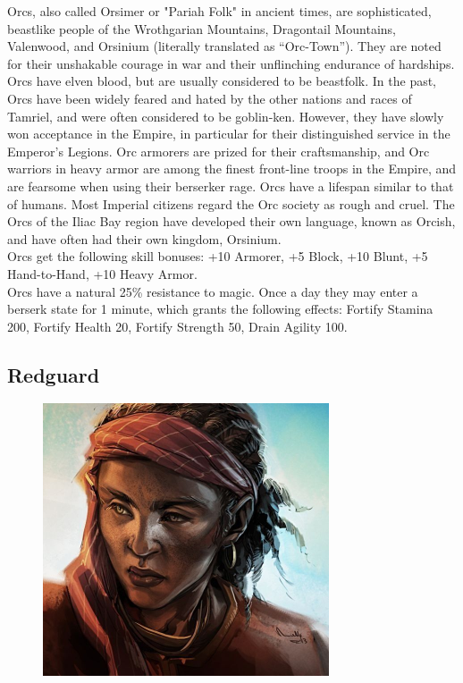 \documentclass[12pt]{book}
\begin{document}
Orcs, also called Orsimer or "Pariah Folk" in ancient times, are sophisticated, beastlike people of the Wrothgarian Mountains, Dragontail Mountains, Valenwood, and Orsinium (literally translated as ``Orc-Town''). They are noted for their unshakable courage in war and their unflinching endurance of hardships. Orcs have elven blood, but are usually considered to be beastfolk. In the past, Orcs have been widely feared and hated by the other nations and races of Tamriel, and were often considered to be goblin-ken. However, they have slowly won acceptance in the Empire, in particular for their distinguished service in the Emperor's Legions. Orc armorers are prized for their craftsmanship, and Orc warriors in heavy armor are among the finest front-line troops in the Empire, and are fearsome when using their berserker rage. Orcs have a lifespan similar to that of humans. Most Imperial citizens regard the Orc society as rough and cruel. The Orcs of the Iliac Bay region have developed their own language, known as Orcish, and have often had their own kingdom, Orsinium.\\

Orcs get the following skill bonuses: +10 Armorer, +5 Block, +10 Blunt, +5 Hand-to-Hand, +10 Heavy Armor.\\

Orcs have a natural 25\% resistance to magic. Once a day they may enter a berserk state for 1 minute, which grants the following effects: Fortify Stamina 200, Fortify Health 20, Fortify Strength 50, Drain Agility 100.

\subsection{Redguard}
\begin{figure}
	\includegraphics[width=\textwidth]{Redguard.png}
\end{figure}
\end{document}
